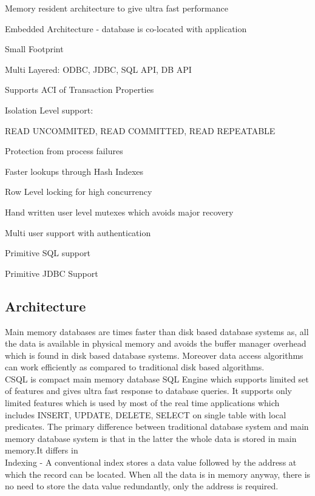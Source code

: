 \documentclass[12pt]{article}
\begin{document}
Memory resident architecture to give ultra fast performance

Embedded Architecture - database is co-located with application

Small Footprint

Multi Layered: ODBC, JDBC, SQL API, DB API

Supports ACI of Transaction Properties

Isolation Level support:

    READ UNCOMMITED, READ COMMITTED, READ REPEATABLE 

Protection from process failures

Faster lookups through Hash Indexes

Row Level locking for high concurrency

Hand written user level mutexes which avoids major recovery

Multi user support with authentication

Primitive SQL support

Primitive JDBC Support


\subsection{Architecture}
\label{arch}
Main memory databases are times faster than disk based database systems as, all the data is available 
in physical memory and avoids the buffer manager overhead which is found in disk based database systems. 
Moreover data access algorithms can work efficiently as compared to traditional disk based algorithms. \\

CSQL is compact main memory database SQL Engine which supports limited set of features and gives ultra 
fast response to database queries. It supports only limited features which is used by most of the real time 
applications which includes INSERT, UPDATE, DELETE, SELECT on single table with local predicates.
The primary difference between traditional database system and main memory database system is that in the 
latter the whole data is stored in main memory.It differs in \\

    Indexing - A conventional index stores a data value followed by the address at which the record can be 
               located. When all the data is in memory anyway, there is no need to store the data value 
               redundantly, only the address is required. \\
\end{document}
